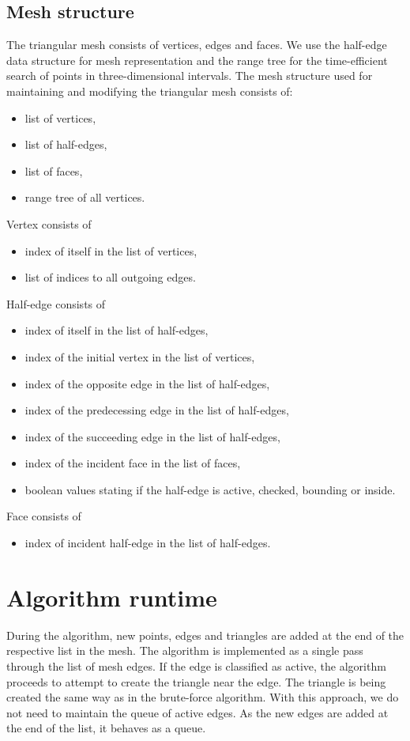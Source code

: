 \subsection{Mesh structure}
The triangular mesh consists of vertices, edges and faces. We use the half-edge 
data structure for mesh representation and the range tree for the time-efficient search of points in three-dimensional intervals.
The mesh structure used for maintaining and modifying the triangular mesh
consists of:
\begin{itemize}
    \setlength\itemsep{-2mm}
    \item list of vertices,
    \item list of half-edges,
    \item list of faces,
    \item range tree of all vertices.
\end{itemize}
Vertex consists of 
\begin{itemize}
    \setlength\itemsep{-2mm}
    \item index of itself in the list of vertices,
    \item list of indices to all outgoing edges.
\end{itemize}
Half-edge consists of 
\begin{itemize}
    \setlength\itemsep{-2mm}
    \item index of itself in the list of half-edges,
    \item index of the initial vertex in the list of vertices,
    \item index of the opposite edge in the list of half-edges,
    \item index of the predecessing edge in the list of half-edges,
    \item index of the succeeding edge in the list of half-edges,
    \item index of the incident face in the list of faces,
    \item boolean values stating if the half-edge is active, checked, 
    bounding or inside.
\end{itemize}
Face consists of
\begin{itemize}
    \setlength\itemsep{-2mm}
    \item index of incident half-edge in the list of half-edges.
\end{itemize}
 
\section{Algorithm runtime}
During the algorithm, new points, edges and triangles are added
at the end of the respective list in the mesh. 
The algorithm is implemented as a single pass through the list of 
mesh edges. 
If the edge is classified as active, the algorithm proceeds 
to attempt to create the triangle near the edge. 
The triangle is being created the same way as in the brute-force
algorithm.
With this approach, we do not need to
maintain the queue of active edges. As the new edges are added at 
the end of the list, it behaves as a queue.


